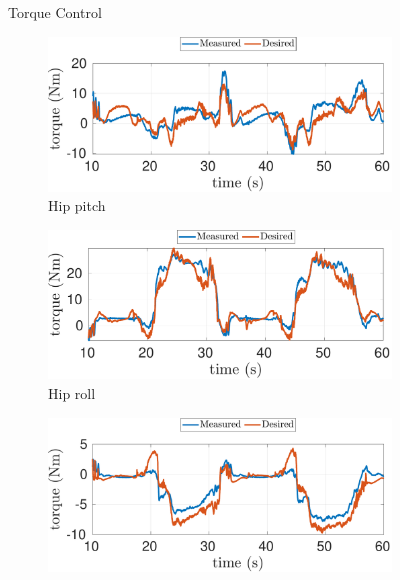 \begin{figure}[!h]
 \begin{myframe}{Torque Control}
    \begin{subfigure}[b]{0.48\textwidth}
        \centering
        \includegraphics[width=\textwidth]{chapter_wbc_benchmarking/figures/torq-real-l_hip_pitch_trq.pdf}
        \caption{Hip pitch}
        \label{fig:real-hip_pitch_trq}
    \end{subfigure}
    \hfill
    \begin{subfigure}[b]{0.48\textwidth}
        \centering
        \includegraphics[width=\textwidth]{chapter_wbc_benchmarking/figures/torq-real-l_hip_roll_trq.pdf}
        \caption{Hip roll}
        \label{fig:real-hip_roll_trq}
    \end{subfigure} 
    \hfill
    \begin{subfigure}[b]{0.48\textwidth}
        \centering
        \includegraphics[width=\textwidth]{chapter_wbc_benchmarking/figures/torq-real-l_hip_yaw_trq.pdf}

\end{subfigure}
\end{myframe}
\end{figure}
